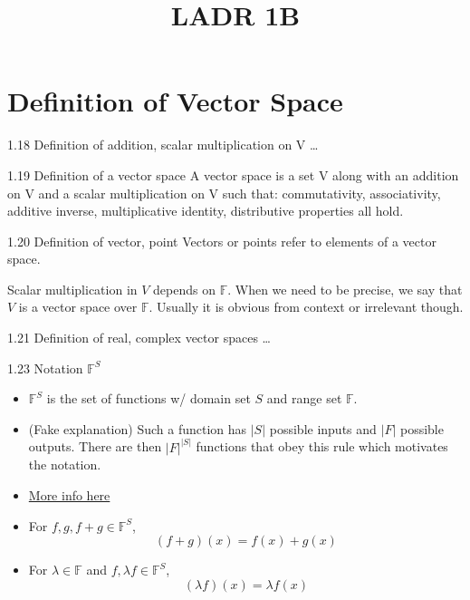 \documentclass[12pt, letterpaper]{article}
\title{LADR 1B}
\begin{document}
\maketitle

\section*{Definition of Vector Space}
\begin{imp}{1.18 Definition of addition, scalar multiplication on V}
\ldots
\end{imp}

\begin{imp}{1.19 Definition of a vector space}
A vector space is a set V along with an addition on V and a scalar multiplication on V such that:
commutativity, associativity, additive inverse, multiplicative identity, distributive properties
all hold.
\end{imp}
    
\begin{imp}{1.20 Definition of vector, point}
Vectors or points refer to elements of a vector space.
\end{imp}
    
Scalar multiplication in $V$ depends on $\mathbb{F}$. When we need to be precise, we
say that $V$ is a vector space over $\mathbb{F}$. Usually it is obvious from context
or irrelevant though.
    
\begin{imp}{1.21 Definition of real, complex vector spaces}
\ldots
\end{imp}
    
\begin{imp}{1.23 Notation $\mathbb{F}^S$}
\begin{itemize}
    \item $\mathbb{F}^S$ is the set of functions w/ domain set $S$ and range set $\mathbb{F}$.
    \item (Fake explanation) Such a function has $|S|$ possible inputs and $|F|$ possible outputs.
    There are then $|F|^{|S|}$ functions that obey this rule which motivates the notation.
    \item \href{https://math.stackexchange.com/questions/4358397/why-fs-represents-set-of-functions-from-s-to-f}{More info here}
    \item For $f,g,f+g\in\mathbb{F}^S$,
    $$(f+g)(x) = f(x) + g(x)$$
    \item For $\lambda\in\mathbb{F}$ and $f,\lambda f\in\mathbb{F}^S$,
    $$(\lambda f)(x)=\lambda f(x)$$
\end{itemize}
\end{imp}
\end{document}
